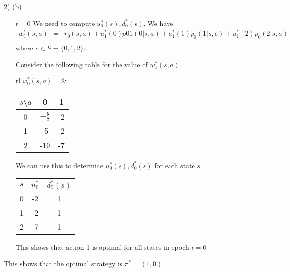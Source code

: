 \documentclass[11pt,a4paper]{article}
\begin{document}
\begin{answer}{2) (b)}
\begin{itemize}
    \item[$t=0$] We need to compute $u_0^*(s),d_0^*(s)$. We have
    \[\begin{array}{rcl}
      w_0^*(s,a)&=&r_0(s,a)+u_1^*(0)p01(0|s,a)+u_1^*(1)p_0(1|s,a)+u_1^*(2)p_0(2|s,a)\\
    \end{array}\]
    where $s\in S=\{0,1,2\}$.
    \par Consider the following table for the value of $w_1^*(s,a)$
    \begin{center}
      \begin{tabular}{rl}
        $w_0^*(s,a)=$&\begin{tabular}{c|cc}
          $s$\textbackslash$a$&0&1\\\hline
          0&$-\frac52$&-2\\
          1&-5&-2\\
          2&-10&-7
        \end{tabular}
      \end{tabular}
    \end{center}
    We can use this to determine $u_0^*(s),d_0^*(s)$ for each state $s$
    \begin{center}
        \begin{tabular}{c|c|c}
          $s$&$u_0^*$&$d_0^*(s)$\\
          0&-2&1\\
          1&-2&1\\
          2&-7&1
        \end{tabular}
    \end{center}
    This shows that action 1 is optimal for all states in epoch $t=0$
  \end{itemize}
  This shows that the optimal strategy is $\pi^*=(1,0)$
\end{answer}
\end{document}
